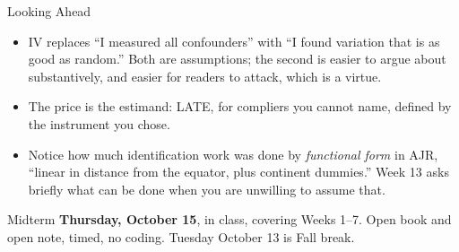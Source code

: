 \documentclass[aspectratio=169,11pt,xcolor=dvipsnames]{beamer}
\begin{document}
\begin{frame}{Looking Ahead}
\begin{itemize}\itemsep4pt
  \item IV replaces ``I measured all confounders'' with ``I found variation that
        is as good as random.'' Both are assumptions; the second is easier to
        argue about substantively, and easier for readers to attack, which is
        a virtue.
  \item The price is the estimand: LATE, for compliers you cannot name, defined
        by the instrument you chose.
  \item Notice how much identification work was done by \emph{functional form} in
        AJR, ``linear in distance from the equator, plus continent dummies.''
        Week 13 asks briefly what can be done when you are unwilling to assume
        that.
\end{itemize}
\vskip3pt
\begin{block}{Midterm}
\textbf{Thursday, October 15}, in class, covering Weeks 1--7. Open book and open
note, timed, no coding. Tuesday October 13 is Fall break.
\end{block}
\end{frame}
\end{document}
